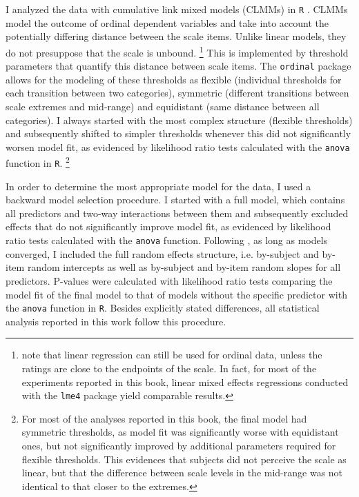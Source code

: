 I analyzed the data with cumulative link mixed models (CLMMs) \citep{christensen2015} in \texttt{R} \citep{rcoreteam2019}. CLMMs model the outcome of ordinal dependent variables and take into account the potentially differing distance between the scale items. Unlike linear models, they do not presuppose that the scale is unbound.%
%
\footnote{\citet[28]{gibson.etal2011} note that linear regression can still be used for ordinal data, unless the ratings are close to the endpoints of the scale. In fact, for most of the experiments reported in this book, linear mixed effects regressions conducted with the \texttt{lme4} package \citep{bates.etal2015} yield comparable results.}\afterfn%
%
This is implemented by threshold parameters that quantify this distance between scale items. The \texttt{ordinal} package allows for the modeling of these thresholds as flexible (individual thresholds for each transition between two categories), symmetric (different transitions between scale extremes and mid-range) and equidistant (same distance between all categories). I always started with the most complex structure (flexible thresholds) and subsequently shifted to simpler thresholds whenever this did not significantly worsen model fit, as evidenced by likelihood ratio tests calculated with the \texttt{anova} function in \texttt{R}.%
%
\footnote{For most of the analyses reported in this book, the final model had symmetric thresholds, as model fit was significantly worse with equidistant ones, but not significantly improved by additional parameters required for flexible thresholds. This evidences that subjects did not perceive the scale as linear, but that the difference between scale levels in the mid-range was not identical to that closer to the extremes.}\afterfn%
%

In order to determine the most appropriate model for the data, I used a backward model selection procedure. I started with a full model, which contains all predictors and two-way interactions between them and subsequently excluded effects that do not significantly improve model fit, as evidenced by likelihood ratio tests calculated with the \texttt{anova} function. Following \citet{barr.etal2013}, as long as models converged, I included the full random effects structure, i.e. by-subject and by-item random intercepts as well as by-subject and by-item random slopes for all predictors. P-values were calculated with likelihood ratio tests comparing the model fit of the final model to that of models without the specific predictor with the \texttt{anova} function in \texttt{R}. Besides explicitly stated differences, all statistical analysis reported in this work follow this procedure.

